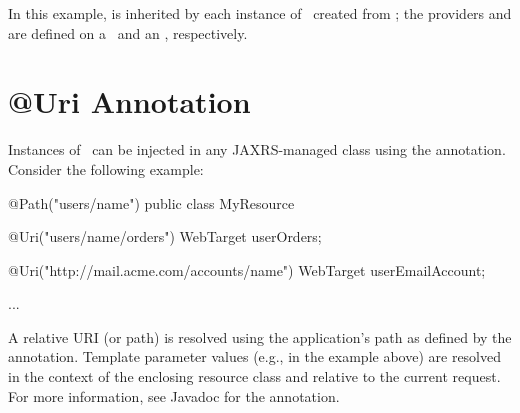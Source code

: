 In this example,  is inherited by each instance of \WebTarget\ created from ; the providers  and  are defined on a \WebTarget\ and an \Invocation, respectively.

\section{@Uri Annotation}

Instances of \WebTarget\ can be injected in any JAXRS-managed class using the  annotation. Consider the following example:
     
\begin{listing}{1}    
@Path("users/{name}")
public class MyResource {
    @Uri("users/{name}/orders")
    WebTarget userOrders;

    @Uri("http://mail.acme.com/accounts/{name}")
    WebTarget userEmailAccount;

    ...
}
\end{listing}

A relative URI (or path) is resolved using the application's path as defined by the  annotation. Template parameter values 
(e.g.,  in the example above) are resolved in the context of the enclosing resource class and relative to the current request. For more information, see Javadoc for the  annotation.




